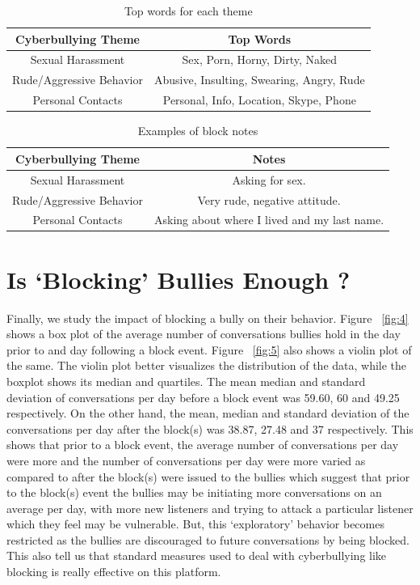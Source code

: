 \begin{table}
	\centering
	\begin{tabular}{| c | c |}
		\hline
		\textbf{Cyberbullying Theme} & \textbf{Top Words} \\ \hline
		Sexual Harassment &   Sex, Porn, Horny, Dirty, Naked   \\ \hline
		Rude/Aggressive Behavior & Abusive, Insulting, Swearing, Angry, Rude    \\ \hline
		Personal Contacts & Personal, Info, Location, Skype, Phone  \\ 
		\hline
	\end{tabular}
	\caption{Top words for each theme}
	\label{table:2}
\end{table}

\begin{table}
	\centering
	\begin{tabular}{| c | c |}
		\hline
		\textbf{Cyberbullying Theme} & \textbf{Notes} \\ \hline
		Sexual Harassment &   Asking for sex.   \\ \hline
		Rude/Aggressive Behavior &   Very rude, negative attitude.  \\ \hline
		Personal Contacts &  Asking about where I lived and my last name.  \\ 
		\hline
	\end{tabular}
	\caption{Examples of block notes}
	\label{table:3}
\end{table}



\section {Is ‘Blocking’ Bullies Enough ?}

Finally, we study the impact of blocking a bully on their behavior. Figure ~\ref{fig:4} shows a box plot of the average number of conversations bullies hold in the day prior to and day following a block event. Figure ~\ref{fig:5} also shows a violin plot of the same. The violin plot better visualizes the distribution of the data, while the boxplot shows its median and quartiles. The mean median and standard deviation of conversations per day before a block event was 59.60, 60 and 49.25 respectively. On the other hand, the mean, median and standard deviation of the conversations per day after the block(s) was 38.87, 27.48 and 37 respectively. This shows that prior to a block event, the average number of conversations per day were more and the number of conversations per day were more varied as compared to after the block(s) were issued to the bullies which suggest that prior to the block(s) event the bullies may be initiating more conversations on an average per day, with more new listeners and trying to attack a particular listener which they feel may be vulnerable. But, this ‘exploratory’ behavior becomes restricted as the bullies are discouraged to future conversations by being blocked. This also tell us that standard measures used to deal with cyberbullying like blocking is really effective on this platform.

